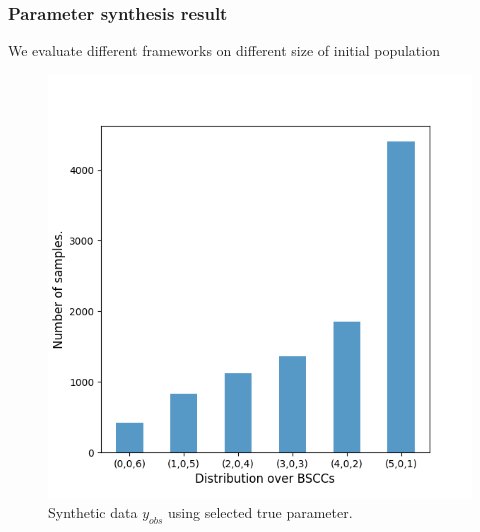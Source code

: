 \subsubsection{Parameter synthesis result}
We evaluate different frameworks on different size of initial population
\begin{figure}[!htb]
    \centering
    \includegraphics[width=0.45\linewidth]{figures/sir510_data.png}
    \caption{Synthetic data $y_{obs}$ using selected true parameter.}
\end{figure}

